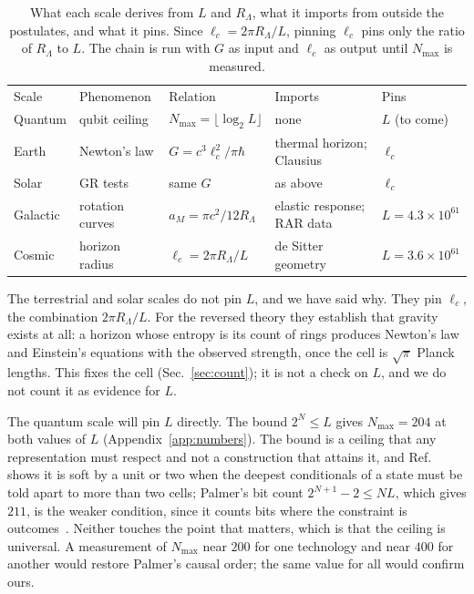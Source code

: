 \documentclass[aps,prd,twocolumn,superscriptaddress,nofootinbib,showkeys]{revtex4-2}
\newcommand{\lc}{\ell_c}
\newcommand{\RL}{R_\Lambda}
\begin{document}
\begin{table}[t]
\caption{What each scale derives from $L$ and $\RL$, what it imports from outside the postulates, and what it pins. Since $\lc = 2\pi\RL/L$, pinning $\lc$ pins only the ratio of $\RL$ to $L$. The chain is run with $G$ as input and $\lc$ as output until $N_{\max}$ is measured.}
\label{tab:pins}
\begin{ruledtabular}
\small\setlength{\tabcolsep}{4pt}
\begin{tabular}{lllll}
Scale & Phenomenon & Relation & Imports & Pins \\
\colrule
Quantum & qubit ceiling & $N_{\max}=\lfloor\log_2L\rfloor$ & none & $L$ (to come) \\
Earth & Newton's law & $G=c^3\lc^2/\pi\hbar$ & thermal horizon; Clausius & $\lc$ \\
Solar & GR tests & same $G$ & as above & $\lc$ \\
Galactic & rotation curves & $a_M=\pi c^2/12\RL$ & elastic response; RAR data & $L=4.3\!\times\!10^{61}$ \\
Cosmic & horizon radius & $\lc=2\pi\RL/L$ & de Sitter geometry & $L=3.6\!\times\!10^{61}$ \\
\end{tabular}
\end{ruledtabular}
\end{table}

The terrestrial and solar scales do not pin $L$, and we have said why. They pin $\lc$, the combination $2\pi\RL/L$. For the reversed theory they establish that gravity exists at all: a horizon whose entropy is its count of rings produces Newton's law and Einstein's equations with the observed strength, once the cell is $\sqrt\pi$ Planck lengths. This fixes the cell (Sec.~\ref{sec:count}); it is not a check on $L$, and we do not count it as evidence for $L$.

The quantum scale will pin $L$ directly. The bound $2^N\le L$ gives $N_{\max}=204$ at both values of $L$ (Appendix~\ref{app:numbers}). The bound is a ceiling that any representation must respect and not a construction that attains it, and Ref.~\cite{korytko2026c} shows it is soft by a unit or two when the deepest conditionals of a state must be told apart to more than two cells; Palmer's bit count $2^{N+1}-2\le NL$, which gives $211$, is the weaker condition, since it counts bits where the constraint is outcomes~\cite{palmer2026c,korytko2026c}. Neither touches the point that matters, which is that the ceiling is universal. A measurement of $N_{\max}$ near $200$ for one technology and near $400$ for another would restore Palmer's causal order; the same value for all would confirm ours.
\end{document}
